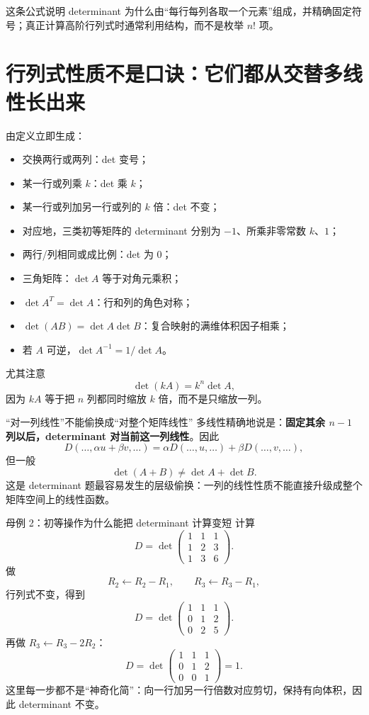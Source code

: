\documentclass[11pt,a4paper]{ctexart}
\newcommand{\kw}[1]{\textbf{\color{deep}#1}}
\begin{document}
这条公式说明 determinant 为什么由“每行每列各取一个元素”组成，并精确固定符号；真正计算高阶行列式时通常利用结构，而不是枚举 $n!$ 项。

\section{行列式性质不是口诀：它们都从交替多线性长出来}

由定义立即生成：

\begin{itemize}
  \item 交换两行或两列：det 变号；
  \item 某一行或列乘 $k$：det 乘 $k$；
  \item 某一行或列加另一行或列的 $k$ 倍：det 不变；
  \item 对应地，三类初等矩阵的 determinant 分别为 $-1$、所乘非零常数 $k$、$1$；
  \item 两行/列相同或成比例：det 为 $0$；
  \item 三角矩阵：$\det A$ 等于对角元乘积；
  \item $\det A^T=\det A$：行和列的角色对称；
  \item $\det(AB)=\det A\det B$：复合映射的满维体积因子相乘；
  \item 若 $A$ 可逆，$\det A^{-1}=1/\det A$。
\end{itemize}

尤其注意
\[
\boxed{\det(kA)=k^n\det A,}
\]
因为 $kA$ 等于把 $n$ 列都同时缩放 $k$ 倍，而不是只缩放一列。

\begin{warnbox}{“对一列线性”不能偷换成“对整个矩阵线性”}
多线性精确地说是：\kw{固定其余 $n-1$ 列以后，determinant 对当前这一列线性}。因此
\[
D(\dots,\alpha u+\beta v,\dots)
=\alpha D(\dots,u,\dots)+\beta D(\dots,v,\dots),
\]
但一般
\[
\boxed{\det(A+B)\neq\det A+\det B.}
\]
这是 determinant 题最容易发生的层级偷换：一列的线性性质不能直接升级成整个矩阵空间上的线性函数。
\end{warnbox}

\begin{examplebox}{母例 2：初等操作为什么能把 determinant 计算变短}
计算
\[
D=\det\begin{pmatrix}
1&1&1\\
1&2&3\\
1&3&6
\end{pmatrix}.
\]
做
\[
R_2\leftarrow R_2-R_1,
\qquad
R_3\leftarrow R_3-R_1,
\]
行列式不变，得到
\[
D=\det\begin{pmatrix}
1&1&1\\
0&1&2\\
0&2&5
\end{pmatrix}.
\]
再做 $R_3\leftarrow R_3-2R_2$：
\[
D=\det\begin{pmatrix}
1&1&1\\
0&1&2\\
0&0&1
\end{pmatrix}=1.
\]
这里每一步都不是“神奇化简”：向一行加另一行倍数对应剪切，保持有向体积，因此 determinant 不变。
\end{examplebox}
\end{document}

